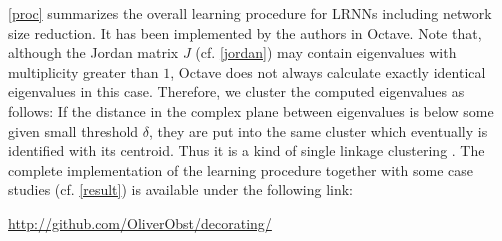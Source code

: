 \documentclass[twoside,11pt]{article}
\theoremstyle{definition}
\begin{document}
\cref{proc} summarizes the overall learning procedure for LRNNs including
network size reduction. It has been implemented by the authors in Octave. Note
that, although the Jordan matrix $J$ (cf. \cref{jordan}) may
contain eigenvalues with multiplicity greater than $1$, Octave does not always
calculate exactly identical eigenvalues in this case. Therefore, we cluster the
computed eigenvalues as follows: If the distance in the complex plane between
eigenvalues is below some given small threshold $\delta$, they are put into the
same cluster which eventually is identified with its centroid. Thus it is a kind
of single linkage clustering \citep{GR69}. The complete implementation of the
learning procedure together with some case studies (cf. \cref{result}) is
available under the following link:
\begin{center}
	\url{http://github.com/OliverObst/decorating/}
\end{center}
\end{document}

